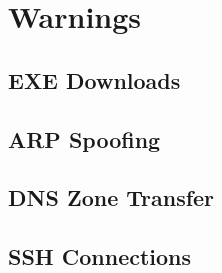 \documentclass[10pt,a4paper,titlepage]{article}
\let\stdsection\section
\renewcommand\section{\clearpage\stdsection}
\newcommand\altrowcolorodd{__TABLE_ODD_COLOR__}
\newcommand\altrowcoloreven{__TABLE_EVEN_COLOR__}
\let\oldtabularx\tabularx
\let\endoldtabularx\endtabularx
\renewenvironment{tabularx}{%
    \rowcolors{2}{\altrowcoloreven}{\altrowcolorodd}%
    \oldtabularx%
}{%
    \endoldtabularx%
    \global\rownum=0\relax%
}
\begin{document}



\section{Warnings}

    \subsection{EXE Downloads}

    \subsection{ARP Spoofing}

    \subsection{DNS Zone Transfer}

    \subsection{SSH Connections}
\end{document}
